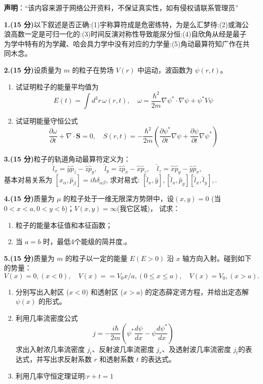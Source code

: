 
\textbf{声明}：“该内容来源于网络公开资料，不保证真实性，如有侵权请联系管理员”

\textbf{1.(15 分)}以下叙述是否正确:(1)宇称算符成是危密练特，为是么汇梦待:(2)或海公浪高数一定是可归一化的:(3)时间反演对称性导致能尿分恒:(4)自欣角从经是最子为学中特有的为学藏、哈会具力学中没有对应的力学量:(5)角动最算符知广作在共同木念。

\textbf{2.(15 分)}设质量为 $m$ 的粒子在势场 $V(r)$ 中运动，波函数为 $\psi(r,t)$。

\begin{enumerate}
    \item  试证明粒子的能量平均值为
    \[
    E(t) = \int d^3r \, \omega(r,t), \quad \omega = \frac{\hbar^2}{2m} \nabla \psi^* \cdot \nabla \psi + \psi^* V \psi~
    \]
    
    \item  试证明能量守恒公式
    \[
    \frac{\partial \omega}{\partial t} + \nabla \cdot \mathbf{S} = 0, \quad S(r,t) = -\frac{\hbar^2}{2m} \left(\frac{\partial \psi^*}{\partial t} \nabla \psi + \frac{\partial \psi}{\partial t} \nabla \psi^*\right)~
    \]
\end{enumerate}
\textbf{3.(15 分)}粒子的轨道角动最算符定义为：
\[
\hat{l}_x = \hat{y} \hat{p}_z - \hat{z} \hat{p}_y, \quad \hat{l}_y = \hat{z} \hat{p}_x - \hat{x} \hat{p}_z, \quad \hat{l}_z = \hat{x} \hat{p}_y - \hat{y} \hat{p}_x,~
\]
基本对易关系为
$[\hat{x}_\alpha, \hat{p}_\beta] = i\hbar \delta_{\alpha\beta}$, 求对易式: $[\hat{l}_x, \hat{y}] ,  [\hat{l}_x, \hat{p}_y] [\hat{l}_x, \hat{l}_y] , .$

\textbf{4.(15 分)}质量为 $\mu$ 的粒子处于一维无限深方势阱中，设$(x,y)=0$ (当 $0 < x < a, 0 < y < b$)；$V(x, y) =\infty$(我它区城)，
试求：
\begin{enumerate}
    \item  粒子的能量本征值和本征函数；
    \item  当 $a = b$ 时，最低4个能级的简并度,。
\end{enumerate}

\textbf{5.(15 分)}质量为 $m$ 的粒子以一定的能量 $E (E > 0)$ 沿 $x$ 轴方向入射。碰到如下的势量：
\[
V(x) = 0, (x < 0), \quad V(x) = =V_0 x/a, (0 \leq x \leq a), \quad V(x) = V_0, (x > a).~
\]

\begin{enumerate}
    \item  分别写出入射区 ($x < 0$) 和透射区 ($x > a$) 的定态薛定谔方程，并给出定态解 $\psi(x)$ 的形式。
    
    \item  利用几率流密度公式
    \[
    j = -\frac{i\hbar}{2m} \left(\psi^* \frac{d\psi}{dx} - \psi \frac{d\psi^*}{dx} \right)~
    \]
    求出入射浓几率流密度 $j_i$、反射波几率流密度 $j_r$、及透射波几率流密度 $j_t$的表达式，并写出求反射系数 $r$ 和透射系数 $t$ 的表达式。
    \item  利用几率守恒定理证明:$r+t=1$
\end{enumerate}

